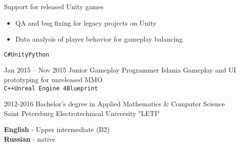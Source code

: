 \documentclass[9pt]{developercv} %
\begin{document}
\begin{entrylist}
{	Support for released Unity games
	\begin{itemize}
		\item QA and bug fixing for legacy projects on Unity
		\item Data analysis of player behavior for gameplay balancing
	\end{itemize}
	{\texttt{C\#}\slashsep\texttt{Unity}\slashsep\texttt{Python}}
	}
	\entry
	{Jan 2015 -- Nov 2015}
	{Junior Gameplay Programmer}
	{Islania}
	{
	Gameplay and UI prototyping for unreleased MMO \\ {\texttt{C++}\slashsep\texttt{Unreal Engine 4}\slashsep\texttt{Blueprint}}
	}
\end{entrylist}



\begin{entrylist}
	\entry
	{2012-2016}
	{Bachelor's degree in Applied Mathematics \& Computer Science \\ \footnotesize{Saint Petersburg Electrotechnical University "LETI"} }
	{}
	{}
\end{entrylist}


\begin{minipage}[t]{0.5\textwidth}
	\vspace{-\baselineskip} %


	\textbf{English} - Upper intermediate (B2)\\
	\textbf{Russian} - native
\end{minipage}
\hfill

\end{document}

